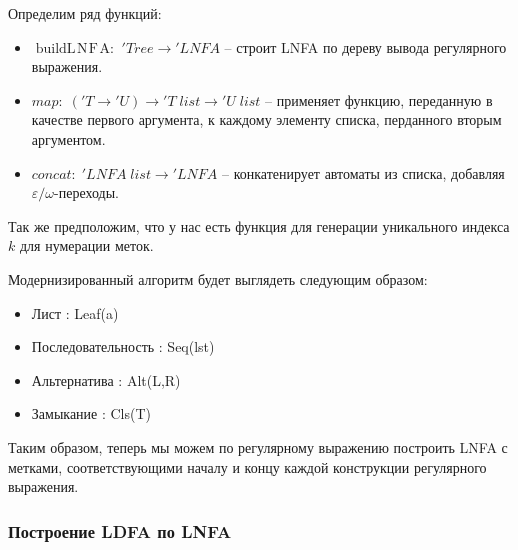 Определим ряд функций:
\begin{itemize}
  \item $\mathop{buildL\!N\!F\!A:} \; 'Tree \rightarrow {'L\!N\!F\!A}$ -- строит LNFA по дереву вывода регулярного выражения.

  \item $map: \; ('T \rightarrow {'U}) \rightarrow {'T}  \; list \rightarrow {'U} \; list$ -- применяет функцию, переданную в качестве первого аргумента, к каждому элементу списка, перданного вторым аргументом.

  \item $concat: \; 'L\!N\!F\!A \; list \rightarrow {'L\!N\!F\!A}$ -- конкатенирует автоматы из списка, добавляя $\varepsilon/\omega$-переходы.  
\end{itemize}

Так же предположим, что у нас есть функция для генерации уникального индекса $k$ для нумерации меток.

Модернизированный алгоритм будет выглядеть следующим образом:
  \begin{itemize}
    \item
      Лист : Leaf(a) \
      \begin{flushleft}
        
      \end{flushleft}
    \item 
      Последовательность : Seq(lst) \
      \begin{flushleft}
        
      \end{flushleft}
    \item 
      Альтернатива : Alt(L,R) \
      \begin{flushleft}
        
      \end{flushleft}
    \item 
      Замыкание : Cls(T) \
      \begin{flushleft}
        
      \end{flushleft}
  \end{itemize}

Таким образом, теперь мы можем по регулярному выражению построить LNFA с метками, соответствующими началу и концу каждой конструкции регулярного выражения.


\subsubsection{Построение LDFA по LNFA}

